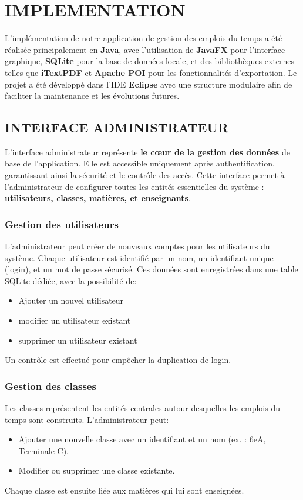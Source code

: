 \documentclass[english,12pt,a4paper]{report}
\begin{document}
 
 \chapter{IMPLEMENTATION}
L’implémentation de notre application de gestion des emplois du temps a été réalisée principalement en \textbf{Java}, avec l’utilisation de \textbf{JavaFX} pour l’interface graphique, \textbf{SQLite} pour la base de données locale, et des bibliothèques externes telles que \textbf{iTextPDF} et \textbf{Apache POI} pour les fonctionnalités d’exportation. Le projet a été développé dans l’IDE \textbf{Eclipse} avec une structure modulaire afin de faciliter la maintenance et les évolutions futures.


 \section{INTERFACE ADMINISTRATEUR}
 L’interface administrateur représente \textbf{le cœur de la gestion des données} de base de l’application. Elle est accessible uniquement après authentification, garantissant ainsi la sécurité et le contrôle des accès. Cette interface permet à l'administrateur de configurer toutes les entités essentielles du système : \textbf{utilisateurs, classes, matières, et enseignants}.
 
 \subsection{Gestion des utilisateurs}
 L'administrateur peut créer de nouveaux comptes pour les utilisateurs du système. Chaque utilisateur est identifié par un nom, un identifiant unique (login), et un mot de passe sécurisé. Ces données sont enregistrées dans une table SQLite dédiée, avec la possibilité de: 
 \begin{itemize}
 	\item Ajouter un nouvel utilisateur
 	\item modifier un utilisateur existant
 	\item supprimer un utilisateur existant
 \end{itemize}
 Un contrôle est effectué pour empêcher la duplication de login.
 \subsection{Gestion des classes}
 Les classes représentent les entités centrales autour desquelles les emplois du temps sont construits. L’administrateur peut:
 \begin{itemize}
 	\item Ajouter une nouvelle classe avec un identifiant et un nom (ex. : 6eA, Terminale C).
 	\item Modifier ou supprimer une classe existante.
 \end{itemize}
 Chaque classe est ensuite liée aux matières qui lui sont enseignées.
\end{document}
